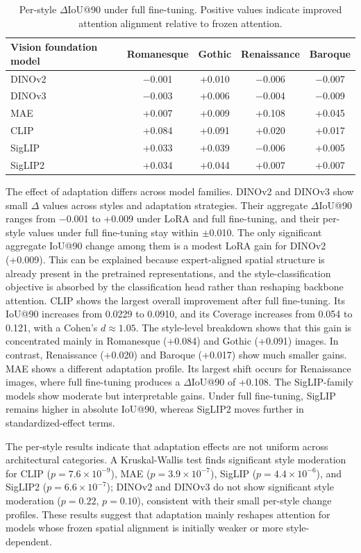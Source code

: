 \documentclass[lineno,pdflatex,sn-mathphys-num]{sn-jnl}%
\theoremstyle{thmstyleone}%
\theoremstyle{thmstyletwo}%
\theoremstyle{thmstylethree}%
\begin{document}
\begin{table}[!h]
\centering
\caption{Per-style $\Delta$IoU@90 under full fine-tuning. Positive values indicate improved attention alignment relative to frozen attention.}
\label{table RQ3 perstyle}
\begin{tabular}{lcccc}
\toprule
Vision foundation model & Romanesque & Gothic & Renaissance & Baroque \\ \midrule
DINOv2  & $-$0.001 & +0.010 & $-$0.006 & $-$0.007 \\
DINOv3  & $-$0.003 & +0.006 & $-$0.004 & $-$0.009 \\
MAE     & +0.007 & +0.009 & +0.108 & +0.045 \\
CLIP    & +0.084 & +0.091 & +0.020 & +0.017 \\
SigLIP  & +0.033 & +0.039 & $-$0.006 & +0.005 \\
SigLIP2 & +0.034 & +0.044 & +0.007 & +0.007 \\
\bottomrule
\end{tabular}
\end{table}

The effect of adaptation differs across model families. DINOv2 and DINOv3 show small $\Delta$ values across styles and adaptation strategies. Their aggregate $\Delta$IoU@90 ranges from $-$0.001 to +0.009 under LoRA and full fine-tuning, and their per-style values under full fine-tuning stay within $\pm$0.010. The only significant aggregate IoU@90 change among them is a modest LoRA gain for DINOv2 (+0.009). This can be explained because expert-aligned spatial structure is already present in the pretrained representations, and the style-classification objective is absorbed by the classification head rather than reshaping backbone attention. CLIP shows the largest overall improvement after full fine-tuning. Its IoU@90 increases from 0.0229 to 0.0910, and its Coverage increases from 0.054 to 0.121, with a Cohen's $d \approx 1.05$. The style-level breakdown shows that this gain is concentrated mainly in Romanesque (+0.084) and Gothic (+0.091) images. In contrast, Renaissance (+0.020) and Baroque (+0.017) show much smaller gains. MAE shows a different adaptation profile. Its largest shift occurs for Renaissance images, where full fine-tuning produces a $\Delta$IoU@90 of +0.108. The SigLIP-family models show moderate but interpretable gains. Under full fine-tuning, SigLIP remains higher in absolute IoU@90, whereas SigLIP2 moves further in standardized-effect terms. 

The per-style results indicate that adaptation effects are not uniform across architectural categories. A Kruskal-Wallis test finds significant style moderation for CLIP ($p=7.6\times10^{-9}$), MAE ($p=3.9\times10^{-7}$), SigLIP ($p=4.4\times10^{-6}$), and SigLIP2 ($p=6.6\times10^{-7}$); DINOv2 and DINOv3 do not show significant style moderation ($p=0.22$, $p=0.10$), consistent with their small per-style change profiles. These results suggest that adaptation mainly reshapes attention for models whose frozen spatial alignment is initially weaker or more style-dependent.
\end{document}
